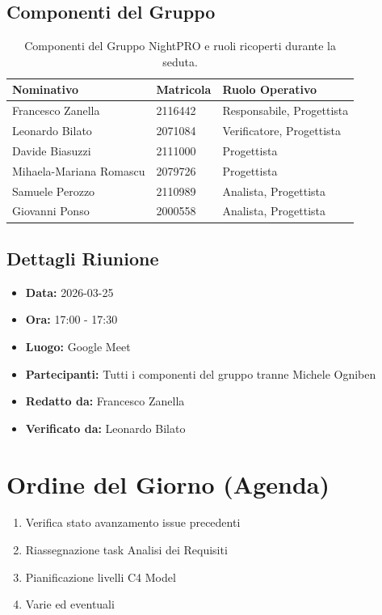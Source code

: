 \documentclass[a4paper, 11pt, oneside]{scrartcl} %
\begin{document}
\subsection{Componenti del Gruppo}
\begin{table}[h!]
\centering
\begin{tabular}{@{}lll@{}}
\toprule
\textbf{Nominativo} & \textbf{Matricola} & \textbf{Ruolo Operativo} \\
\midrule
Francesco Zanella & 2116442 & Responsabile, Progettista \\
Leonardo Bilato & 2071084 & Verificatore, Progettista \\
Davide Biasuzzi & 2111000 & Progettista \\
Mihaela-Mariana Romascu & 2079726 & Progettista \\
Samuele Perozzo & 2110989 & Analista, Progettista \\
Giovanni Ponso & 2000558 & Analista, Progettista \\
\bottomrule
\end{tabular}
\caption{Componenti del Gruppo NightPRO e ruoli ricoperti durante la seduta.}
\end{table}

\subsection{Dettagli Riunione}
\begin{itemize}
    \item \textbf{Data:} 2026-03-25
    \item \textbf{Ora:} 17:00 - 17:30
    \item \textbf{Luogo:} Google Meet
    \item \textbf{Partecipanti:} Tutti i componenti del gruppo tranne Michele Ogniben
    \item \textbf{Redatto da:} Francesco Zanella
    \item \textbf{Verificato da:} Leonardo Bilato
\end{itemize}

\newpage
\section{Ordine del Giorno (Agenda)}
\begin{enumerate}
    \item Verifica stato avanzamento issue precedenti
    \item Riassegnazione task Analisi dei Requisiti
    \item Pianificazione livelli C4 Model
    \item Varie ed eventuali
\end{enumerate}
\end{document}
